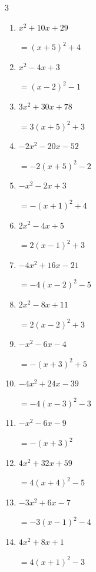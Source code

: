 \begin{multicols}{3}
\begin{enumerate}
  \item $x^{2}+10x+29$

        $=\left( x+5\right)^{2}+4$

  \item $x^{2}-4x+3$

        $=\left( x-2\right)^{2}-1$

  \item $3x^{2}+30x+78$

        $=3\left( x+5\right)^{2}+3$

  \item $-2x^{2}-20x-52$

        $=-2\left( x+5\right)^{2}-2$

  \item $-x^{2}-2x+3$

        $=-\left( x+1\right)^{2}+4$

\columnbreak %

\resetques

  \item $2x^{2}-4x+5$

        $=2\left( x-1\right)^{2}+3$

  \item $-4x^{2}+16x-21$

        $=-4\left( x-2\right)^{2}-5$

  \item $2x^{2}-8x+11$

        $=2\left( x-2\right)^{2}+3$

  \item $-x^{2}-6x-4$

        $=-\left( x+3\right)^{2}+5$

  \item $-4x^{2}+24x-39$

        $=-4\left( x-3\right)^{2}-3$

  \item $-x^{2}-6x-9$

        $=-\left( x+3\right)^{2}$

  \item $4x^{2}+32x+59$

        $=4\left( x+4\right)^{2}-5$

  \item $-3x^{2}+6x-7$

        $=-3\left( x-1\right)^{2}-4$

  \item $4x^{2}+8x+1$

        $=4\left( x+1\right)^{2}-3$


\end{enumerate}
\end{multicols}
